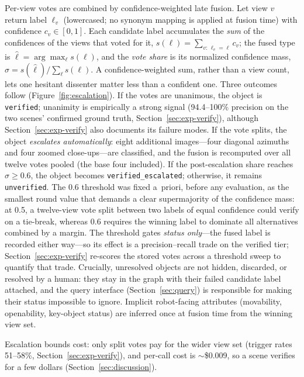 \documentclass[electronics,article,accept,pdftex,moreauthors]{Definitions/mdpi}
\begin{document}
Per-view votes are combined by confidence-weighted late fusion. Let view $v$
return label $\ell_v$ (lowercased; no synonym mapping is applied at fusion
time) with confidence $c_v\in[0,1]$. Each candidate label accumulates the
\emph{sum} of the confidences of the views that voted for it,
$s(\ell)=\sum_{v:\,\ell_v=\ell}c_v$; the fused type is
$\hat{\ell}=\arg\max_{\ell}s(\ell)$, and the \emph{vote share} is its
normalized confidence mass, $\sigma=s(\hat{\ell})/\sum_{\ell}s(\ell)$.
A confidence-weighted sum, rather than a view count, lets one hesitant
dissenter matter less than a confident one. Three outcomes follow
(Figure~\ref{fig:escalation}). If the votes are
unanimous, the object is \texttt{verified}; unanimity is empirically a strong
signal (94.4--100\% precision on the two scenes' confirmed ground truth,
Section~\ref{sec:exp-verify}),
although Section~\ref{sec:exp-verify} also documents its failure modes. If the vote splits, the
object \emph{escalates automatically}: eight additional images---four diagonal
azimuths and four zoomed close-ups---are classified, and the fusion is
recomputed over all twelve votes pooled (the base four included). If the
post-escalation share reaches $\sigma\ge0.6$,
the object becomes \texttt{verified\_escalated}; otherwise, it remains
\texttt{unverified}. The 0.6 threshold was fixed a~priori, before any
evaluation, as the smallest round value that demands a clear supermajority
of the confidence mass: at 0.5, a twelve-view vote split between two labels
of equal confidence could verify on a tie-break, whereas 0.6 requires the
winning label to dominate all alternatives combined by a margin. The
threshold gates \emph{status only}---the fused label is recorded either
way---so its effect is a precision--recall trade on the verified tier;
Section~\ref{sec:exp-verify} re-scores the stored votes across a threshold
sweep to quantify that trade. Crucially, unresolved objects are not hidden, discarded,
or resolved by a human: they stay in the graph with their failed candidate
label attached, and the query interface (Section~\ref{sec:query}) is responsible
for making their status impossible to ignore. Implicit robot-facing
attributes (movability, openability, key-object status) are inferred once at
fusion time from the winning view set.

Escalation bounds cost: only split votes pay for the wider view set
(trigger rates 51--58\%, Section~\ref{sec:exp-verify}), and per-call cost is $\sim$\$0.009, so a
scene verifies for a few dollars (Section~\ref{sec:discussion}).
\end{document}
